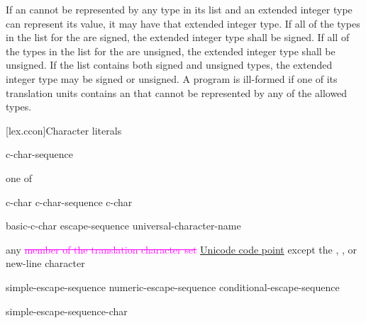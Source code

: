 \documentclass{wg21}
\newcommand{\addedTranslation}[1]{\textcolor{addclrTwo}{\uline{#1}}}
\newcommand{\removedTranslation}[1]{\textcolor{magenta}{\sout{#1}}}
\newcommand{\changedTranslation}[2]{\removedTranslation{#1} \addedTranslation{#2}}
\begin{document}
\pnum
If an 
cannot be represented by any type in its list and
an extended integer type can represent its value,
it may have that extended integer type.
If all of the types in the list for the 
are signed,
the extended integer type shall be signed.
If all of the types in the list for the 
are unsigned,
the extended integer type shall be unsigned.
If the list contains both signed and unsigned types,
the extended integer type may be signed or unsigned.
A program is ill-formed
if one of its translation units contains an 
that cannot be represented by any of the allowed types.

[lex.ccon]{Character literals}

%
\begin{bnf}
    \br
      c-char-sequence 
\end{bnf}

\begin{bnf}
     \textnormal{one of}\br
    \quad{}\quad{}\quad{}
\end{bnf}

\begin{bnf}
    \br
    c-char\br
    c-char-sequence c-char
\end{bnf}

\begin{bnf}
    \br
    basic-c-char\br
    escape-sequence\br
    universal-character-name
\end{bnf}

\begin{bnf}
    \br
    \textnormal{any \changedTranslation{member of the translation character set}{Unicode code point} except the ,}\br
    \bnfindent\textnormal{, or new-line character}
\end{bnf}

\begin{bnf}
    \br
    simple-escape-sequence\br
    numeric-escape-sequence\br
    conditional-escape-sequence
\end{bnf}

\begin{bnf}
    \br
    \terminal{\textbackslash} simple-escape-sequence-char
\end{bnf}
\end{document}
